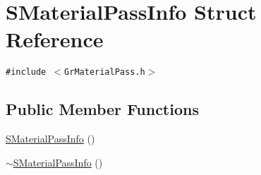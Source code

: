 \hypertarget{struct_s_material_pass_info}{
\section{SMaterialPassInfo Struct Reference}
\label{struct_s_material_pass_info}
}
{\tt \#include $<$GrMaterialPass.h$>$}

\subsection*{Public Member Functions}
\begin{CompactItemize}
\item 
\hyperlink{struct_s_material_pass_info_188cd731132ec93cdb46f1b94a34d9eb}{SMaterialPassInfo} ()
\item 
\hyperlink{struct_s_material_pass_info_2c919007aec4f01db30c5eaa03d5470c}{$\sim$SMaterialPassInfo} ()
\end{CompactItemize}
